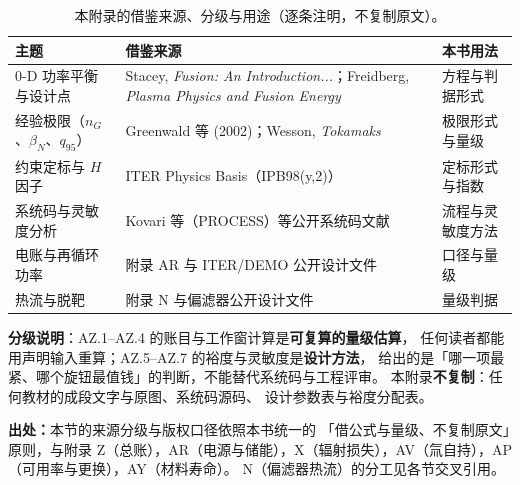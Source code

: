\begin{table}[htbp]
\centering
\small
\setlength{\tabcolsep}{4pt}
\caption{本附录的借鉴来源、分级与用途（逐条注明，不复制原文）。}
\label{tab:app-az-source}
\begin{tabular}{p{5.0cm}p{5.0cm}p{2.8cm}}
\toprule
主题 & 借鉴来源 & 本书用法 \\
\midrule
0-D 功率平衡与设计点 & Stacey, \emph{Fusion: An Introduction...}；Freidberg, \emph{Plasma Physics and Fusion Energy} & 方程与判据形式 \\
经验极限（$n_G$、$\beta_N$、$q_{95}$） & Greenwald 等 (2002)；Wesson, \emph{Tokamaks} & 极限形式与量级 \\
约束定标与 $H$ 因子 & ITER Physics Basis（IPB98(y,2)） & 定标形式与指数 \\
系统码与灵敏度分析 & Kovari 等（PROCESS）等公开系统码文献 & 流程与灵敏度方法 \\
电账与再循环功率 & 附录 AR 与 ITER/DEMO 公开设计文件 & 口径与量级 \\
热流与脱靶 & 附录 N 与偏滤器公开设计文件 & 量级判据 \\
\bottomrule
\end{tabular}

\end{table}

\textbf{分级说明}：AZ.1--AZ.4 的账目与工作窗计算是\textbf{可复算的量级估算}，
任何读者都能用声明输入重算；AZ.5--AZ.7 的裕度与灵敏度是\textbf{设计方法}，
给出的是「哪一项最紧、哪个旋钮最值钱」的判断，不能替代系统码与工程评审。
本附录\textbf{不复制}：任何教材的成段文字与原图、系统码源码、
设计参数表与裕度分配表。

\textbf{出处：}本节的来源分级与版权口径依照本书统一的
「借公式与量级、不复制原文」原则，与附录 Z（总账），AR（电源与储能），X（辐射损失），AV（氚自持），AP（可用率与更换），AY（材料寿命）。
N（偏滤器热流）的分工见各节交叉引用。
\endgroup
